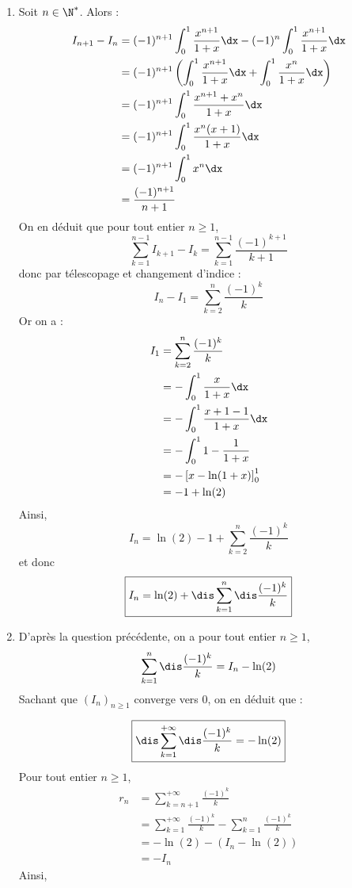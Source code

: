 \documentclass[a4paper,twoside,french,10pt]{VcCours}
\begin{document}
\begin{enumerate}
\begin{enumerate}
\begin{enumerate}
    
    \item Soit $n\in\N^*$. Alors :
    \begin{align*}
    I_{n+1}- I_n & = (-1)^{n+1}  \int_{0}^1 \dfrac{x^{n+1}}{1+x} \dx - (-1)^{n}\int_{0}^1 \dfrac{x^{n+1}}{1+x} \dx \\
    & = (-1)^{n+1} \left(\int_{0}^1 \dfrac{x^{n+1}}{1+x} \dx + \int_{0}^1 \dfrac{x^{n}}{1+x} \dx \right) \\
    & = (-1)^{n+1} \int_{0}^1 \dfrac{x^{n+1}+x^n}{1+x} \dx \\
    &  = (-1)^{n+1} \int_{0}^1 \dfrac{x^n(x+1)}{1+x} \dx \\
    & = (-1)^{n+1} \int_{0}^1x^n \dx \\
    & = \dfrac{(-1)^{n+1}}{n+1}
    \end{align*}
    On en déduit que pour tout entier $n \geq 1$,
    $$ \sum_{k=1}^{n-1} I_{k+1}- I_k = \sum_{k=1}^{n-1} \dfrac{(-1)^{k+1}}{k+1}$$
    donc par télescopage et changement d'indice :
    $$ I_n- I_1 = \sum_{k=2}^{n} \dfrac{(-1)^{k}}{k}$$
    Or on a :
    \begin{align*}
     I_1 & = \sum_{k=2}^{n} \dfrac{(-1)^{k}}{k} \\
    & = - \int_{0}^1 \dfrac{x}{1+x} \dx  \\ 
    & = - \int_{0}^1 \dfrac{x+1-1}{1+x} \dx  \\ 
    & = - \int_{0}^1 1 - \dfrac{1}{1+x} \\
    & = - \left[x - \ln(1+x) \right]_0^1 \\
    & = - 1+ \ln(2)
    \end{align*}
    Ainsi,
    $$ I_n = \ln(2)-1 + \sum_{k=2}^{n} \dfrac{(-1)^{k}}{k}$$
    et donc 
    $$ \boxed{ I_n=\ln(2)+\dis\sum_{k=1}^n\dis\frac{(-1)^k}{k}}$$
    \item D'après la question précédente, on a pour tout entier $n \geq 1$,
    $$ \sum_{k=1}^n\dis\frac{(-1)^k}{k}  =  I_n - \ln(2)$$
    Sachant que $(I_n)_{n \geq 1}$ converge vers $0$, on en déduit que :
    
    $$\boxed{\dis\sum_{k=1}^{+\infty}\dis\frac{(-1)^k}{k} = - \ln(2)}$$
    Pour tout entier $n \geq 1$,
    \begin{align*}
     r_n & = \sum_{k=n+1}^{+ \infty} \frac{(-1)^k}{k}  \\
     & = \sum_{k=1}^{+ \infty} \frac{(-1)^k}{k}  - \sum_{k=1}^{n} \frac{(-1)^k}{k}  \\
     & = - \ln(2) - (I_n - \ln(2)) \\
     & = - I_n
    \end{align*}
    Ainsi,
    

\end{enumerate}
\end{enumerate}
\end{enumerate}
\end{document}
